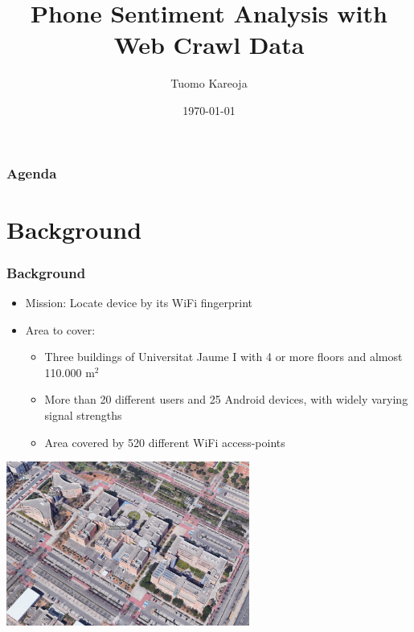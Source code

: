 \documentclass[10pt]{beamer}
\title[What Phone do People Like?]{Phone Sentiment Analysis with Web Crawl Data} %
\author{Tuomo Kareoja} %
\institute[IOT Analytics] %
{
IOT Analytics \\ %
\medskip
}
\date{\today} %
\begin{document}
\begin{frame}
\titlepage %
\end{frame}

\begin{frame}
\frametitle{Agenda} %
\tableofcontents %
\end{frame}


\section{Background}

\begin{frame}
\frametitle{
    Background
}

\begin{itemize}
    \item Mission: Locate device by its WiFi fingerprint
    \item Area to cover:
    \begin{itemize}
        \item Three buildings of Universitat Jaume I with 4 or more floors and almost 110.000 m\(^2\)
        \item More than 20 different users and 25 Android devices, with widely varying signal strengths
        \item Area covered by 520 different WiFi access-points
    \end{itemize}
\end{itemize}


{
    \centering
    \includegraphics[width=8cm,keepaspectratio]{university_campus_gmaps.png}
    \par
}

\end{frame}
\end{document}
